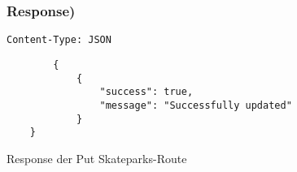 \subsubsection{Response)}
\begin{code}
    \lstinline{Content-Type: JSON}
    \begin{lstlisting}
        {
            {
                "success": true,
                "message": "Successfully updated"
            }
    }
    \end{lstlisting}
    \caption{Response der Put Skateparks-Route}
\end{code}

\pagebreak

